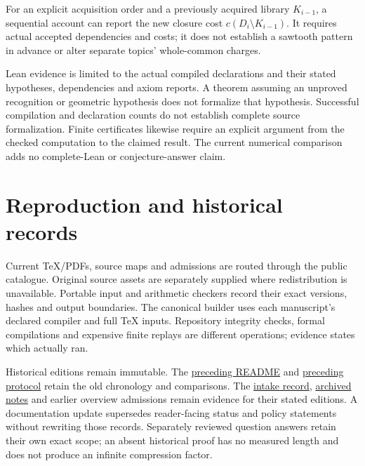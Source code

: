 \documentclass[11pt,a4paper]{article}
\begin{document}
For an explicit acquisition order and a previously acquired library $K_{i-1}$,
a sequential account can report the new closure cost
$c(D_i\setminus K_{i-1})$. It requires actual accepted dependencies and costs;
it does not establish a sawtooth pattern in advance or alter separate topics'
whole-common charges.

Lean evidence is limited to the actual compiled declarations and their stated
hypotheses, dependencies and axiom reports. A theorem assuming an unproved
recognition or geometric hypothesis does not formalize that hypothesis.
Successful compilation and declaration counts do not establish complete source
formalization. Finite certificates likewise require an explicit argument from
the checked computation to the claimed result. The current numerical comparison
adds no complete-Lean or conjecture-answer claim.

\section{Reproduction and historical records}

Current TeX/PDFs, source maps and admissions are routed through the public
catalogue. Original source assets are separately supplied where redistribution
is unavailable. Portable input and arithmetic checkers record their exact
versions, hashes and output boundaries. The canonical builder uses each
manuscript's declared compiler and full TeX inputs. Repository integrity checks,
formal compilations and expensive finite replays are different operations;
evidence states which actually ran.

Historical editions remain immutable. The
\href{documentation/v1/previous/README.rst}{preceding README} and
\href{documentation/v1/previous/protocol.pdf}{preceding protocol} retain the old
chronology and comparisons. The \href{intake.json}{intake record},
\href{archive\_markdown.json}{archived notes} and earlier overview admissions
remain evidence for their stated editions. A documentation update supersedes
reader-facing status and policy statements without rewriting those records.
Separately reviewed question answers retain their own exact scope; an absent
historical proof has no measured length and does not produce an infinite
compression factor.
\end{document}

